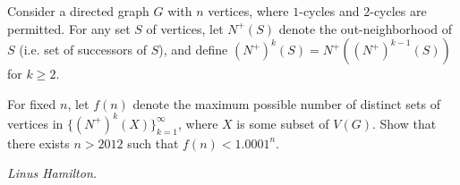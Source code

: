 Consider a directed graph $G$ with $n$ vertices, where $1$-cycles and $2$-cycles are permitted. For any set $S$ of vertices, let $N^{+}(S)$ denote the out-neighborhood of $S$ (i.e. set of successors of $S$), and define $(N^{+})^k(S)=N^{+}((N^{+})^{k-1}(S))$ for $k\ge2$.

For fixed $n$, let $f(n)$ denote the maximum possible number of distinct sets of vertices in $\{(N^{+})^k(X)\}_{k=1}^{\infty}$, where $X$ is some subset of $V(G)$. Show that there exists $n>2012$ such that $f(n)<1.0001^n$.

\textit{Linus Hamilton.}